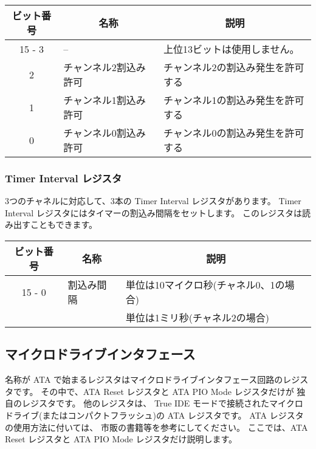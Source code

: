 \begin{center}
\begin{tabular}{|c|l|l|}
\hline
ビット番号 & \multicolumn{1}{|c|}{名称} & \multicolumn{1}{|c|}{説明} \\
\hline
15 - 3     &  --                        & 上位13ビットは使用しません。\\
\hline
2          &  チャンネル2割込み許可     & チャンネル2の割込み発生を許可する \\
\hline
1          &  チャンネル1割込み許可     & チャンネル1の割込み発生を許可する \\
\hline
0          &  チャンネル0割込み許可     & チャンネル0の割込み発生を許可する \\
\hline
\end{tabular}
\end{center}

\subsubsection{Timer Interval レジスタ}

3つのチャネルに対応して、3本の Timer Interval レジスタがあります。
Timer Interval レジスタにはタイマーの割込み間隔をセットします。
このレジスタは読み出すこともできます。

\begin{center}
\begin{tabular}{|c|l|l|}
\hline
ビット番号 & \multicolumn{1}{|c|}{名称} & \multicolumn{1}{|c|}{説明} \\
\hline
15 - 0     & 割込み間隔  & 単位は10マイクロ秒(チャネル0、1の場合)    \\
           &             & 単位は1ミリ秒(チャネル2の場合)            \\
\hline
\end{tabular}
\end{center}

\subsection{マイクロドライブインタフェース}

名称が ATA で始まるレジスタはマイクロドライブインタフェース回路のレジスタです。
その中で、ATA Reset レジスタと ATA PIO Mode レジスタだけが
\tac 独自のレジスタです。
他のレジスタは、
True IDE モードで接続されたマイクロドライブ(またはコンパクトフラッシュ)の
ATA レジスタです。
ATA レジスタの使用方法に付いては、
市販の書籍等を参考にしてください。
ここでは、ATA Reset レジスタと ATA PIO Mode レジスタだけ説明します。

